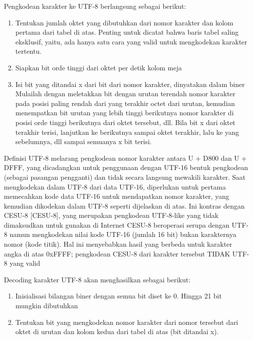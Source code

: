 \begin{enumerate}
   Pengkodean karakter ke UTF-8 berlangsung sebagai berikut:
   \begin{enumerate}
   	\item Tentukan jumlah oktet yang dibutuhkan dari nomor karakter
       dan kolom pertama dari tabel di atas. Penting untuk dicatat
       bahwa baris tabel saling eksklusif, yaitu, ada
       hanya satu cara yang valid untuk mengkodekan karakter tertentu.
    \item Siapkan bit orde tinggi dari oktet per detik
       kolom meja
    \item Isi bit yang ditandai x dari bit dari nomor karakter,
       dinyatakan dalam biner Mulailah dengan meletakkan bit dengan urutan terendah
       nomor karakter pada posisi paling rendah dari yang terakhir
       octet dari urutan, kemudian menempatkan bit urutan yang lebih tinggi berikutnya
       nomor karakter di posisi orde tinggi berikutnya dari oktet tersebut,
       dll. Bila bit x dari oktet terakhir terisi, lanjutkan ke
       berikutnya sampai oktet terakhir, lalu ke yang sebelumnya, dll sampai semuanya
       x bit terisi.
    \end{enumerate}

    Definisi UTF-8 melarang pengkodean nomor karakter antara
   U + D800 dan U + DFFF, yang dicadangkan untuk penggunaan dengan UTF-16
   bentuk pengkodean (sebagai pasangan pengganti) dan tidak secara langsung mewakili
   karakter. Saat mengkodekan dalam UTF-8 dari data UTF-16, diperlukan
   untuk pertama memecahkan kode data UTF-16 untuk mendapatkan nomor karakter, yang
   kemudian dikodekan dalam UTF-8 seperti dijelaskan di atas. Ini kontras dengan
   CESU-8 [CESU-8], yang merupakan pengkodean UTF-8-like yang tidak dimaksudkan untuk
   gunakan di Internet CESU-8 beroperasi serupa dengan UTF-8 namun mengkodekan
   nilai kode UTF-16 (jumlah 16 bit) bukan karakternya
   nomor (kode titik). Hal ini menyebabkan hasil yang berbeda untuk karakter
   angka di atas 0xFFFF; pengkodean CESU-8 dari karakter tersebut TIDAK
   UTF-8 yang valid

   Decoding karakter UTF-8 akan menghasilkan sebagai berikut:
   \begin{enumerate}
   \item Inisialisasi bilangan biner dengan semua bit diset ke 0. Hingga 21 bit
       mungkin dibutuhkan

   \item Tentukan bit yang mengkodekan nomor karakter dari nomor tersebut
       dari oktet di urutan dan kolom kedua dari tabel
       di atas (bit ditandai x).


\end{enumerate}
\end{enumerate}
